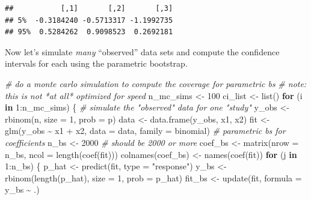 \documentclass[
]{book}
\newenvironment{Shaded}{\begin{snugshade}}{\end{snugshade}}
\newcommand{\AttributeTok}[1]{\textcolor[rgb]{0.77,0.63,0.00}{#1}}
\newcommand{\CommentTok}[1]{\textcolor[rgb]{0.56,0.35,0.01}{\textit{#1}}}
\newcommand{\ControlFlowTok}[1]{\textcolor[rgb]{0.13,0.29,0.53}{\textbf{#1}}}
\newcommand{\DecValTok}[1]{\textcolor[rgb]{0.00,0.00,0.81}{#1}}
\newcommand{\FunctionTok}[1]{\textcolor[rgb]{0.00,0.00,0.00}{#1}}
\newcommand{\NormalTok}[1]{#1}
\newcommand{\OtherTok}[1]{\textcolor[rgb]{0.56,0.35,0.01}{#1}}
\newcommand{\SpecialCharTok}[1]{\textcolor[rgb]{0.00,0.00,0.00}{#1}}
\newcommand{\StringTok}[1]{\textcolor[rgb]{0.31,0.60,0.02}{#1}}
\begin{document}
\begin{verbatim}
##           [,1]       [,2]       [,3]
## 5%  -0.3184240 -0.5713317 -1.1992735
## 95%  0.5284262  0.9098523  0.2692181
\end{verbatim}

Now let's simulate \emph{many} ``observed'' data sets and compute the confidence intervals for each using the parametric bootstrap.

\begin{Shaded}
\begin{Highlighting}[]
\CommentTok{\# do a monte carlo simulation to compute the coverage for parametric bs}
\CommentTok{\# note: this is not *at all* optimized for speed}
\NormalTok{n\_mc\_sims }\OtherTok{\textless{}{-}} \DecValTok{100}
\NormalTok{ci\_list }\OtherTok{\textless{}{-}} \FunctionTok{list}\NormalTok{()}
\ControlFlowTok{for}\NormalTok{ (i }\ControlFlowTok{in} \DecValTok{1}\SpecialCharTok{:}\NormalTok{n\_mc\_sims) \{}
  \CommentTok{\# simulate the "observed" data for one "study"}
\NormalTok{  y\_obs }\OtherTok{\textless{}{-}} \FunctionTok{rbinom}\NormalTok{(n, }\AttributeTok{size =} \DecValTok{1}\NormalTok{, }\AttributeTok{prob =}\NormalTok{ p)}
\NormalTok{  data }\OtherTok{\textless{}{-}} \FunctionTok{data.frame}\NormalTok{(y\_obs, x1, x2)}
\NormalTok{  fit }\OtherTok{\textless{}{-}} \FunctionTok{glm}\NormalTok{(y\_obs }\SpecialCharTok{\textasciitilde{}}\NormalTok{ x1 }\SpecialCharTok{+}\NormalTok{ x2, }\AttributeTok{data =}\NormalTok{ data, }\AttributeTok{family =}\NormalTok{ binomial)}
  \CommentTok{\# parametric bs for coefficients}
\NormalTok{  n\_bs }\OtherTok{\textless{}{-}} \DecValTok{2000}  \CommentTok{\# should be 2000 or more}
\NormalTok{  coef\_bs }\OtherTok{\textless{}{-}} \FunctionTok{matrix}\NormalTok{(}\AttributeTok{nrow =}\NormalTok{ n\_bs, }\AttributeTok{ncol =} \FunctionTok{length}\NormalTok{(}\FunctionTok{coef}\NormalTok{(fit)))}
  \FunctionTok{colnames}\NormalTok{(coef\_bs) }\OtherTok{\textless{}{-}} \FunctionTok{names}\NormalTok{(}\FunctionTok{coef}\NormalTok{(fit))}
  \ControlFlowTok{for}\NormalTok{ (j }\ControlFlowTok{in} \DecValTok{1}\SpecialCharTok{:}\NormalTok{n\_bs) \{}
\NormalTok{    p\_hat }\OtherTok{\textless{}{-}} \FunctionTok{predict}\NormalTok{(fit, }\AttributeTok{type =} \StringTok{"response"}\NormalTok{)}
\NormalTok{    y\_bs }\OtherTok{\textless{}{-}} \FunctionTok{rbinom}\NormalTok{(}\FunctionTok{length}\NormalTok{(p\_hat), }\AttributeTok{size =} \DecValTok{1}\NormalTok{, }\AttributeTok{prob =}\NormalTok{ p\_hat)}
\NormalTok{    fit\_bs }\OtherTok{\textless{}{-}} \FunctionTok{update}\NormalTok{(fit, }\AttributeTok{formula =}\NormalTok{ y\_bs }\SpecialCharTok{\textasciitilde{}}\NormalTok{ .)}

\end{Highlighting}
\end{Shaded}
\end{document}
